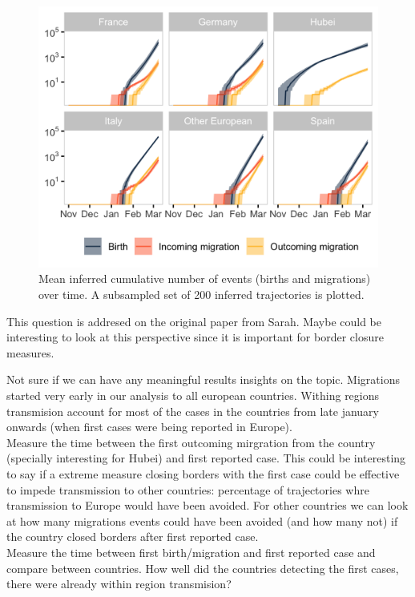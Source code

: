 \documentclass[12pt,]{article}
\begin{document}
\begin{figure}[ht]
    \centering
    \includegraphics[width=\textwidth]{201014_europe2_figtraj06.png}
    \caption{Mean inferred cumulative number of events (births and migrations) over time. A subsampled set of 200 inferred trajectories is plotted.}
    \label{fig:events}
\end{figure}

This question is addresed on the original paper from Sarah.  Maybe could be interesting to look at this perspective since it is important for border closure measures.

 Not sure if we can have any meaningful results insights on the topic. Migrations started very early in our analysis to all european countries. Withing regions transmision account for most of the cases in the countries from late january onwards (when first cases were being reported in Europe).\\

 Measure the time between the first outcoming mirgration from the country  (specially interesting for Hubei) and first reported case. This could be interesting to say if a extreme measure closing borders with the first case could be effective to impede transmission to other countries: percentage of trajectories whre transmission to Europe would have been avoided. For other countries we can look at how many migrations events could have been avoided (and how many not) if the country closed borders after first reported case.\\ 

 Measure the time between first birth/migration and first reported case and compare between countries. How well did the countries detecting the first cases, there were already within region transmision?\\
\end{document}
